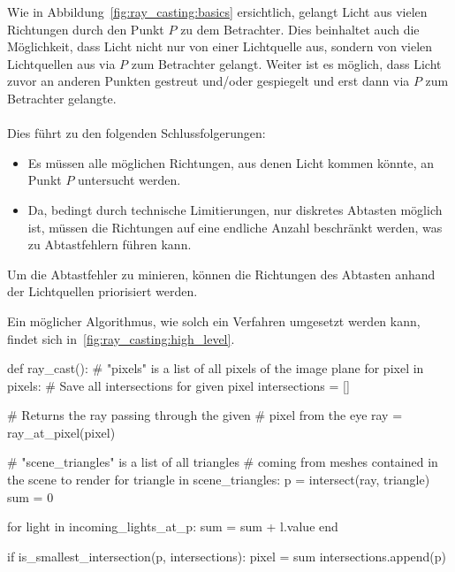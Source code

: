 Wie in Abbildung~\ref{fig:ray_casting:basics} ersichtlich, gelangt Licht aus vielen Richtungen durch den Punkt $P$ zu dem Betrachter. Dies beinhaltet auch die Möglichkeit, dass
Licht nicht nur von einer Lichtquelle aus, sondern von vielen Lichtquellen aus via $P$ zum Betrachter gelangt. Weiter ist es möglich, dass Licht zuvor an anderen Punkten gestreut
und/oder gespiegelt und erst dann via $P$ zum Betrachter gelangte.\\
\\
Dies führt zu den folgenden Schlussfolgerungen:
\begin{itemize}
    \item Es müssen alle möglichen Richtungen, aus denen Licht kommen könnte, an Punkt $P$ untersucht werden.
    \item Da, bedingt durch technische Limitierungen, nur diskretes Abtasten möglich ist, müssen die Richtungen auf eine endliche Anzahl beschränkt werden, was zu Abtastfehlern führen kann.
\end{itemize}
Um die Abtastfehler zu minieren, können die Richtungen des Abtasten anhand der Lichtquellen priorisiert werden.

\newpage{}

Ein möglicher Algorithmus, wie solch ein Verfahren umgesetzt werden kann, findet sich in~\ref{fig:ray_casting:high_level}.

\begin{python}[caption={Eine abstrakte Umsetzung des Ray Castings.\protect\footnotemark},label={fig:ray_casting:high_level}]
def ray_cast():
    # "pixels" is a list of all pixels of the image plane
    for pixel in pixels:
        # Save all intersections for given pixel
        intersections = []

        # Returns the ray passing through the given
        # pixel from the eye
        ray           = ray_at_pixel(pixel)

        # "scene_triangles" is a list of all triangles
        # coming from meshes contained in the scene to render
        for triangle in scene_triangles:
            p   = intersect(ray, triangle)
            sum = 0

            for light in incoming_lights_at_p:
                sum = sum + l.value
            end

            if is_smallest_intersection(p, intersections):
                pixel = sum
            intersections.append(p)
\end{python}

